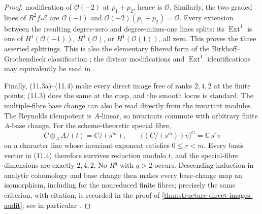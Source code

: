 \begin{proof}
modification of $\mathcal O(-2)$ at $p_1+p_2$, hence is $\mathcal O$.
Similarly, the two graded lines of $R^2f_*\mathcal E$ are
$\mathcal O(-1)$ and
$\mathcal O(-2)(p_1+p_2)=\mathcal O$.  Every extension between the resulting
degree-zero and degree-minus-one lines splits: its $\operatorname{Ext}^1$
is one of $H^1(\mathcal O(-1))$, $H^1(\mathcal O)$, or
$H^1(\mathcal O(1))$, all zero.  This proves the three asserted splittings.
This is also the elementary filtered form of the
Birkhoff--Grothendieck classification
\cite[Theorem~2.1, p.~126]{Grothendieck1957}; the divisor modifications and
$\operatorname{Ext}^1$ identifications may equivalently be read in
\cite[Tags 0C6K, 0B3A, and 01XT]{StacksProject}.

Finally, (11.3a)--(11.4) make every direct image free of ranks $2,4,2$ at
the finite points; (11.3) does the same at the cusp, and the smooth locus is
standard.  The multiple-fibre base change can also be read directly from the
invariant modules.  The Reynolds idempotent is $A$-linear, so invariants
commute with arbitrary finite $A$-base change.  For the scheme-theoretic
special fibre,
\[
 C\otimes_AA/(t)=C/(s^m),
 \qquad
 \bigl((C/(s^m))v\bigr)^G=\mathbb C\,s^rv
\]
on a character line whose invariant exponent satisfies $0\le r<m$.
Every basis vector in (11.4) therefore survives reduction modulo $t$, and
the special-fibre dimensions are exactly $2,4,2$.  No $R^q$ with $q>2$
occurs.  Descending induction in analytic cohomology and base change then
makes every base-change map an isomorphism, including for the nonreduced
finite fibres; precisely the same criterion, with citation, is recorded in
the proof of
\cref{thm:structure-direct-images-audit}; see in particular
\cite[Chapter~III, \S3, Theorem~3.4 and Corollary~3.10]{BanicaStanasila1976}.
\end{proof}
